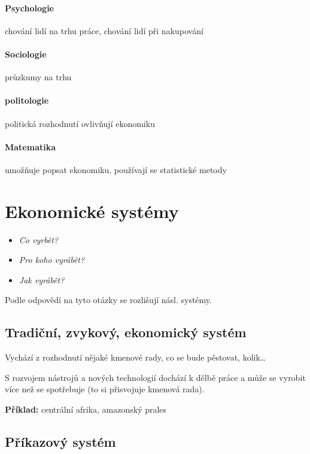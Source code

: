 \documentclass[10pt,a4paper,
twoside,%
]{report}
\begin{document}
\paragraph{Psychologie} chování lidí na trhu práce, chování lidí při nakupování

\paragraph{Sociologie} průzkumy na trhu

\paragraph{politologie} politická rozhodnutí ovlivňují ekonomiku

\paragraph{Matematika} umožňuje popsat ekonomiku, používají se statistické metody

\section{Ekonomické systémy}

\begin{itemize}
\item\emph{Co vyrbět?}
\item\emph{Pro koho vyrábět?}
\item\emph{Jak vyrábět?}
\end{itemize}

Podle odpovědí na tyto otázky se rozlišují násl. systémy.

\subsection{Tradiční, zvykový, ekonomický systém}

Vychází z rozhodnutí nějaké kmenové rady, co se bude pěstovat, kolik\dots

S rozvojem nástrojů a nových technologií dochází k dělbě práce a může se vyrobit více než se spotřebuje (to si přisvojuje kmenová rada).

\textbf{Příklad:} centrální afrika, amazonský prales

\subsection{Příkazový systém}
\end{document}
